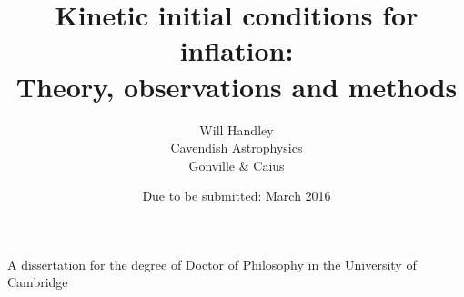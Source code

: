 \title{Kinetic initial conditions for inflation:\\ {\large Theory, observations and methods}}

\author{Will Handley\\
Cavendish Astrophysics \\
Gonville \& Caius}
\date{Due to be submitted: March 2016}

\maketitle

\centerline{%
 A dissertation for the degree of Doctor of Philosophy
in the University of Cambridge }

